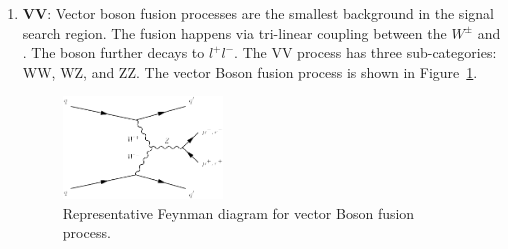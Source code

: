 \begin{enumerate}
\item {\bf{VV}}: Vector boson fusion processes are the smallest 
    background in the signal search region. The fusion happens via 
    tri-linear coupling between the $W^\pm$ and \PZ. The \PZ boson 
    further decays to $l^+l^-$. The VV process has three 
    sub-categories: WW, WZ, and ZZ. The vector Boson fusion process 
    is shown in Figure~\ref{fig:feyn_diag_vv}.
\begin{figure}
\begin{center}
\includegraphics[width=0.40\textwidth]{Image/FeynDiag/feyn_diag_vv.png}
\caption{Representative Feynman diagram for vector Boson fusion process.}
\label{fig:feyn_diag_vv}
\end{center}
\end{figure}
\end{enumerate}

